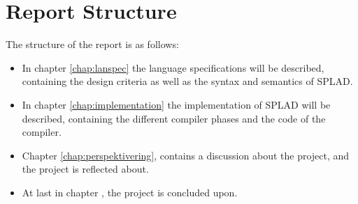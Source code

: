 \section{Report Structure}
The structure of the report is as follows:
\begin{itemize}
	\item In chapter \ref{chap:lanspec} the language specifications will be described, containing the design criteria as well as the syntax and semantics of SPLAD.
	\item In chapter \ref{chap:implementation} the implementation of SPLAD will be described, containing the different compiler phases and the code of the compiler.
	\item Chapter \ref{chap:perspektivering}, contains a discussion about the project, and the project is reflected about. 
	\item At last in chapter \label{chap:konklusion}, the project is concluded upon. 
\end{itemize}